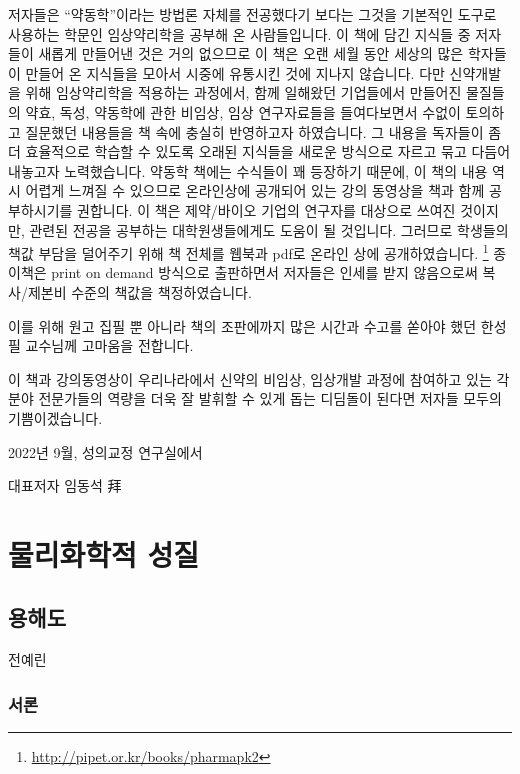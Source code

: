 \documentclass[
  11pt,
  krantz2, a4paper, twoside]{krantz}
\begin{document}
저자들은 ``약동학''이라는 방법론 자체를 전공했다기 보다는 그것을 기본적인
도구로 사용하는 학문인 임상약리학을 공부해 온 사람들입니다. 이 책에 담긴
지식들 중 저자들이 새롭게 만들어낸 것은 거의 없으므로 이 책은 오랜 세월
동안 세상의 많은 학자들이 만들어 온 지식들을 모아서 시중에 유통시킨 것에
지나지 않습니다. 다만 신약개발을 위해 임상약리학을 적용하는 과정에서,
함께 일해왔던 기업들에서 만들어진 물질들의 약효, 독성, 약동학에 관한
비임상, 임상 연구자료들을 들여다보면서 수없이 토의하고 질문했던 내용들을
책 속에 충실히 반영하고자 하였습니다. 그 내용을 독자들이 좀 더
효율적으로 학습할 수 있도록 오래된 지식들을 새로운 방식으로 자르고 묶고
다듬어 내놓고자 노력했습니다. 약동학 책에는 수식들이 꽤 등장하기 때문에, 이 책의 내용 역시 어렵게 느껴질 수 있으므로 온라인상에 공개되어 있는 강의 동영상을 책과 함께 공부하시기를 권합니다.
이 책은 제약/바이오 기업의 연구자를 대상으로 쓰여진 것이지만, 관련된 전공을 공부하는 대학원생들에게도 도움이 될 것입니다.
그러므로 학생들의 책값 부담을 덜어주기 위해 책 전체를 웹북과 pdf로 온라인 상에 공개하였습니다. \footnote{\url{http://pipet.or.kr/books/pharmapk2}}
종이책은 print on demand 방식으로 출판하면서 저자들은 인세를 받지 않음으로써 복사/제본비 수준의 책값을 책정하였습니다.

이를 위해 원고 집필 뿐 아니라 책의 조판에까지 많은 시간과 수고를 쏟아야 했던 한성필 교수님께 고마움을 전합니다.

이 책과 강의동영상이 우리나라에서 신약의 비임상, 임상개발 과정에 참여하고 있는 각 분야 전문가들의 역량을 더욱 잘 발휘할 수 있게 돕는 디딤돌이 된다면 저자들 모두의 기쁨이겠습니다.

\hfill 2022년 9월, 성의교정 연구실에서

\hfill 대표저자 임동석 拜

\normalsize

\mainmatter

\part{물리화학적 성질}\label{part-uxbb3cuxb9acuxd654uxd559uxc801-uxc131uxc9c8}

\chapter{용해도}\label{uxc6a9uxd574uxb3c4}

\Large\hfill

전예린
\normalsize

\section{서론}\label{uxc11cuxb860}
\end{document}
